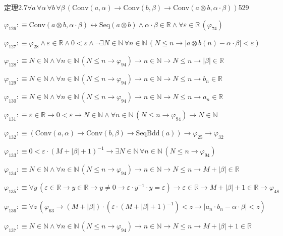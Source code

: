 \begin{fullproof}{定理2.7}{$\forall a\,\forall \alpha\,\forall b\,\forall \beta\,(\mathrm{Conv}(a,\alpha) \to \mathrm{Conv}(b,\beta) \to \mathrm{Conv}(a \otimes b,\alpha \cdot \beta))$}{529}
\begin{abbrevlist}
\item $\varphi_{126} :\equiv \mathrm{Conv}(a \otimes b,\alpha \cdot \beta) \leftrightarrow \mathrm{Seq}(a \otimes b) \land \alpha \cdot \beta \in \mathbb{R} \land \forall \varepsilon \in \mathbb{R}\,(\varphi_{74})$
\item $\varphi_{127} :\equiv \varphi_{28} \land \varepsilon \in \mathbb{R} \land 0 < \varepsilon \land \neg \exists N \in \mathbb{N}\,\forall n \in \mathbb{N}\,(N \leq n \to \lvert a \otimes b(n) - \alpha \cdot \beta \rvert < \varepsilon)$
\item $\varphi_{128} :\equiv N \in \mathbb{N} \land \forall n \in \mathbb{N}\,(N \leq n \to \varphi_{94}) \to n \in \mathbb{N} \to N \leq n \to \lvert \beta \rvert \in \mathbb{R}$
\item $\varphi_{129} :\equiv N \in \mathbb{N} \land \forall n \in \mathbb{N}\,(N \leq n \to \varphi_{94}) \to n \in \mathbb{N} \to N \leq n \to b_{n} \in \mathbb{R}$
\item $\varphi_{130} :\equiv N \in \mathbb{N} \land \forall n \in \mathbb{N}\,(N \leq n \to \varphi_{94}) \to n \in \mathbb{N} \to N \leq n \to a_{n} \in \mathbb{R}$
\item $\varphi_{131} :\equiv \varepsilon \in \mathbb{R} \to 0 < \varepsilon \to N \in \mathbb{N} \land \forall n \in \mathbb{N}\,(N \leq n \to \varphi_{94}) \to N \in \mathbb{N}$
\item $\varphi_{132} :\equiv (\mathrm{Conv}(a,\alpha) \to \mathrm{Conv}(b,\beta) \to \mathrm{SeqBdd}(a)) \to \varphi_{25} \to \varphi_{32}$
\item $\varphi_{133} :\equiv 0 < \varepsilon \cdot (M + \lvert \beta \rvert + 1)^{-1} \to \exists N \in \mathbb{N}\,\forall n \in \mathbb{N}\,(N \leq n \to \varphi_{94})$
\item $\varphi_{134} :\equiv N \in \mathbb{N} \land \forall n \in \mathbb{N}\,(N \leq n \to \varphi_{94}) \to n \in \mathbb{N} \to N \leq n \to M + \lvert \beta \rvert \in \mathbb{R}$
\item $\varphi_{135} :\equiv \forall y\,(\varepsilon \in \mathbb{R} \to y \in \mathbb{R} \to y \neq 0 \to \varepsilon \cdot y^{-1} \cdot y = \varepsilon) \to \varepsilon \in \mathbb{R} \to M + \lvert \beta \rvert + 1 \in \mathbb{R} \to \varphi_{48}$
\item $\varphi_{136} :\equiv \forall z\,(\varphi_{63} \to (M + \lvert \beta \rvert) \cdot (\varepsilon \cdot (M + \lvert \beta \rvert + 1)^{-1}) < z \to \lvert a_{n} \cdot b_{n} - \alpha \cdot \beta \rvert < z)$
\item $\varphi_{137} :\equiv N \in \mathbb{N} \land \forall n \in \mathbb{N}\,(N \leq n \to \varphi_{94}) \to n \in \mathbb{N} \to N \leq n \to M + \lvert \beta \rvert + 1 \in \mathbb{R}$

\end{abbrevlist}
\end{fullproof}
